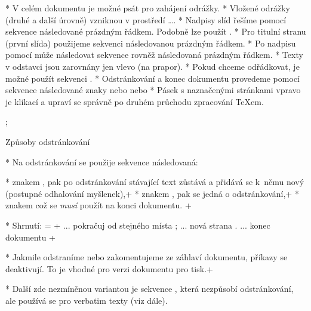 * V celém dokumentu je možné psát \code{\*} pro zahájení odrážky.
* Vložené odrážky (druhé a další úrovně) vzniknou v prostředí 
  \code{\\begitems}\dots\code{\\enditems}.
* Nadpisy slíd řešíme pomocí sekvence \nl
  následované prázdným řádkem. Podobně lze použít .
* Pro titulní stranu (první slída) použijeme sekvenci \nl
  následovanou prázdným řádkem.
* Po nadpisu pomocí \code{\\tit} může následovat sekvence\nl
   rovněž následovaná prázdným řádkem.
* Texty v odstavci jsou zarovnány jen vlevo (na prapor). 
* Pokud chceme odřádkovat, je možné použít sekvenci \code{\\nl}.
* Odstránkování a konec dokumentu provedeme pomocí sekvence \code{\\pg}\nl
  následované znaky \code{+} nebo \code{,} nebo 
* Pásek s naznačenými stránkami vpravo je klikací a upraví se správně po
  druhém průchodu zpracování \TeX{}em.

\pg; %

\sec Způsoby odstránkování

* Na odstránkování se použije sekvence \code{\\pg} následovaná:

\begitems
* znakem \frame{\strut\code{+}}, pak po odstránkování stávající text zůstává
  a přidává se k~němu nový (postupné odhalování myšlenek),\pg+
* znakem \frame{\strut\code{;}}, pak se jedná o  odstránkování,\pg+
* znakem  což se {\it musí} použít na konci dokumentu.
\enditems
\pg+

* Shrnutí:
\pg=\begtt
\pg+    ... pokračuj od stejného místa
\pg;    ... nová strana
\pg.    ... konec dokumentu
\endtt
\pg+

* Jakmile odstraníme nebo zakomentujeme \code{\\slideshow} ze záhlaví dokumentu,
  příkazy \code{\\pg+} se deaktivují. 
  To je vhodné pro verzi dokumentu pro tisk.\pg+

* Další zde nezmíněnou variantou je sekvence \code{\\pg=}, která 
  nezpůsobí odstránkování, ale používá se 
  pro verbatim texty (viz dále).

